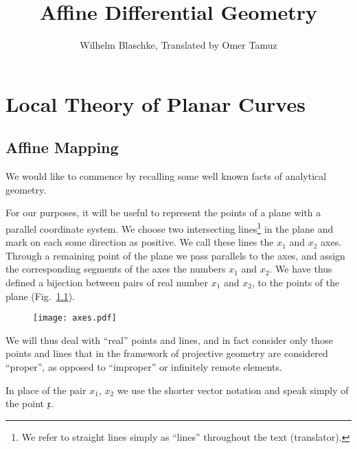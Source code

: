 \documentclass[11pt]{book} \usepackage{amssymb}
\newcommand{\myvec}[1]{\mathfrak{#1}}
\begin{document}
\title{Affine Differential Geometry}

 \author{Wilhelm Blaschke, Translated by Omer Tamuz}
\maketitle

\chapter{Local Theory of Planar Curves}
\section{Affine Mapping}
We would like to commence by recalling some well known facts of analytical 
geometry.

For our purposes, it will be useful to represent the points of a plane with
a parallel coordinate system. We choose two intersecting lines\footnote{We
refer to straight lines simply as ``lines'' throughout the text (translator).}
in the plane and mark on each some direction as positive. We call these lines
the $x_1$ and $x_2$ axes. Through a remaining point of the plane we pass
parallels to the axes, and assign the corresponding segments of the axes 
the numbers $x_1$ and $x_2$. We have thus defined a bijection between 
pairs of real number $x_1$ and $x_2$, to the points of the plane 
(Fig.~\ref{fig:axes}).

\begin{figure}[htp]
  \label{fig:axes}
  \centering
  \texttt{[image: axes.pdf]} 
  \caption{}
\end{figure}

We will thus deal with ``real'' points and lines, and in fact consider only
those points and lines that in the framework of projective geometry are 
considered ``proper'', as opposed to ``improper'' or infinitely remote elements.

In place of the pair $x_1$, $x_2$ we use the shorter vector notation and 
speak simply of the point $\myvec{x}$.
\end{document}
